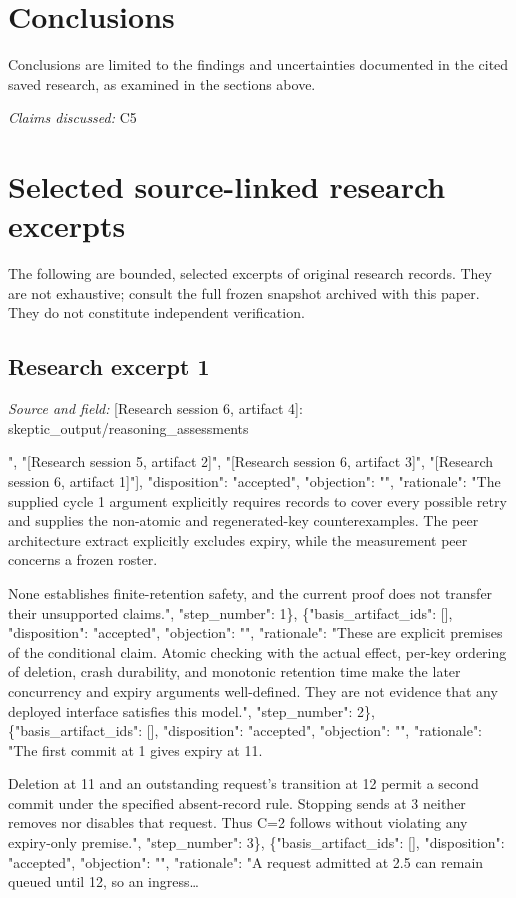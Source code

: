 \documentclass[11pt]{article}
\begin{document}
\section{Conclusions}
Conclusions are limited to the findings and uncertainties documented in the cited saved research, as examined in the sections above.

\textit{Claims discussed: }C5
\appendix
\section{Selected source-linked research excerpts}
The following are bounded, selected excerpts of original research records. They are not exhaustive; consult the full frozen snapshot archived with this paper. They do not constitute independent verification.
\subsection{Research excerpt 1}
\textit{Source and field: }[Research session 6, artifact 4]: skeptic\_output/reasoning\_assessments\par
[\{"basis\_artifact\_ids": ["[Research session 6, artifact 2]", "[Research session 5, artifact 2]", "[Research session 6, artifact 3]", "[Research session 6, artifact 1]"], "disposition": "accepted", "objection": "", "rationale": "The supplied cycle 1 argument explicitly requires records to cover every possible retry and supplies the non-atomic and regenerated-key counterexamples. The peer architecture extract explicitly excludes expiry, while the measurement peer concerns a frozen roster.

None establishes finite-retention safety, and the current proof does not transfer their unsupported claims.", "step\_number": 1\}, \{"basis\_artifact\_ids": [], "disposition": "accepted", "objection": "", "rationale": "These are explicit premises of the conditional claim. Atomic checking with the actual effect, per-key ordering of deletion, crash durability, and monotonic retention time make the later concurrency and expiry arguments well-defined. They are not evidence that any deployed interface satisfies this model.", "step\_number": 2\}, \{"basis\_artifact\_ids": [], "disposition": "accepted", "objection": "", "rationale": "The first commit at 1 gives expiry at 11.

Deletion at 11 and an outstanding request's transition at 12 permit a second commit under the specified absent-record rule. Stopping sends at 3 neither removes nor disables that request. Thus C=2 follows without violating any expiry-only premise.", "step\_number": 3\}, \{"basis\_artifact\_ids": [], "disposition": "accepted", "objection": "", "rationale": "A request admitted at 2.5 can remain queued until 12, so an ingress\ldots{}
\end{document}
